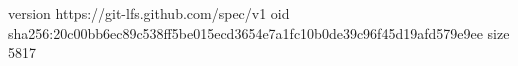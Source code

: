 version https://git-lfs.github.com/spec/v1
oid sha256:20c00bb6ec89c538ff5be015ecd3654e7a1fc10b0de39c96f45d19afd579e9ee
size 5817
